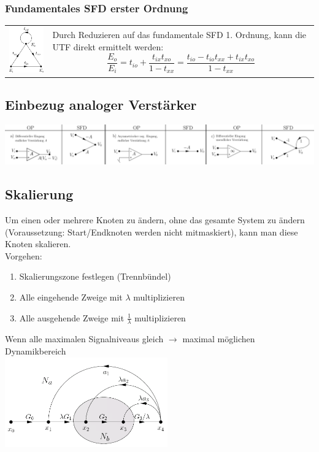 \subsubsection{Fundamentales SFD erster Ordnung }
\begin{tabular}{ll}
	\parbox{7cm}{
    	\includegraphics[width=3cm]{./bilder/sfd-fundamental-erster-ordnung.png}
    }
    & \parbox{12cm}{
		Durch Reduzieren auf das fundamentale SFD 1. Ordnung, kann die UTF direkt
		ermittelt werden: \\
		$$\frac{E_o}{E_i}=
		t_{io}+\frac{t_{ix}t_{xo}}{1-t_{xx}}=
		\frac{t_{io}-t_{io}t_{xx}+t_{ix}t_{xo}}{1-t_{xx}}$$
	}
\end{tabular}

\subsection{Einbezug analoger Verstärker }
\includegraphics[width=18cm]{./bilder/sfd-op.png}

\subsection{Skalierung}
	Um einen oder mehrere Knoten zu ändern, ohne das gesamte System zu
	ändern (Voraussetzung: Start/Endknoten werden nicht mitmaskiert), kann man
	diese Knoten skalieren.\\
	Vorgehen: 
	\begin{enumerate}
                \item Skalierungszone festlegen (Trennbündel)
                \item Alle eingehende Zweige mit $\lambda$ multiplizieren
                \item Alle ausgehende Zweige mit $\frac{1}{\lambda}$
                multiplizieren
    \end{enumerate}
    Wenn alle maximalen Signalniveaus gleich $\rightarrow$ maximal möglichen
    Dynamikbereich\\
    \includegraphics[width=7cm]{./bilder/sfd-scalierung.png}
    

